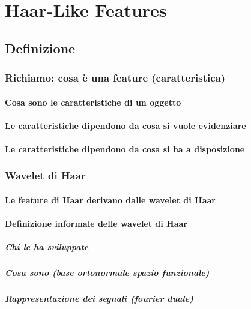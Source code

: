 
\chapter{Haar-Like Features}
\label{chap:features}
    \section{Definizione}
    \label{sec:haar_features_definition}
        \subsection{Richiamo: cosa è una feature (caratteristica)}
            \subsubsection{Cosa sono le caratteristiche di un oggetto}
            \subsubsection{Le caratteristiche dipendono da cosa si vuole evidenziare}
            \subsubsection{Le caratteristiche dipendono da cosa si ha a disposizione}
        \subsection{Wavelet di Haar}
            \subsubsection{Le feature di Haar derivano dalle wavelet di Haar}
            \subsubsection{Definizione informale delle wavelet di Haar}
                \paragraph{Chi le ha sviluppate}
                \paragraph{Cosa sono (base ortonormale spazio funzionale)}
                \paragraph{Rappresentazione dei segnali (fourier duale)}
